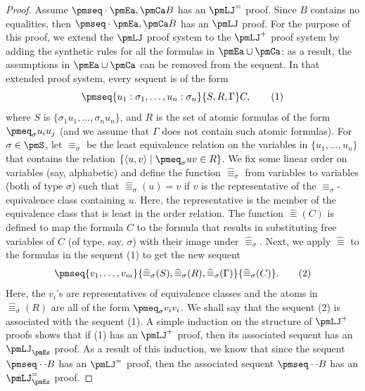 \begin{proof}
Assume $\pmseq\cdot{\pmEa,\pmCa}B$ has an $\pmLJ^=$ proof. Since $B$ contains no equalities, then $\pmseq\cdot{\pmEa,\pmCa}B$ has an $\pmLJ$ proof. For the purpose of this proof, we extend the $\pmLJ$ proof system to the $\pmLJ^+$ proof system by adding the synthetic rules for all the formulas in $\pmEa\cup\pmCa$: as a result, the assumptions in $\pmEa\cup\pmCa$ can be removed from the sequent. In that extended proof system, every sequent is of the form
\begin{equation}\pmseq{u_1:\sigma_1,\ldots,u_n:\sigma_n}{S,R,\Gamma}C,\tag{1}\end{equation}
where $S$ is $\{\sigma_1u_1,\ldots,\sigma_nu_n\}$, and $R$ is the set of atomic formulas of the form $\pmeq_\sigma u_i u_j$ (and we assume that $\Gamma$ does not contain such atomic formulas). For $\sigma\in\pmS$, let $\equiv_\sigma$ be the least equivalence relation on the variables in $\{u_1,\ldots,u_n\}$ that contains the relation $\{\langle u,v\rangle\mid\pmeq_\sigma u v\in R\}$. We fix some linear order on variables (say, alphabetic) and define the function $\widehat{\equiv}_\sigma$ from variables to variables (both of type $\sigma$) such that $\widehat{\equiv}_\sigma(u)=v$ if $v$ is the representative of the $\equiv_\sigma$-equivalence class containing $u$. Here, the representative is the member of the equivalence class that is least in the order relation. The function $\widehat{\equiv}(C)$ is defined to map the formula $C$ to the formula that results in substituting free variables of $C$ (of type, say, $\sigma$) with their image under $\widehat{\equiv}_\sigma$. Next, we apply $\widehat{\equiv}$ to the formulas in the sequent (1) to get the new sequent
\begin{equation}\pmseq{v_1,\ldots,v_m}{\widehat{\equiv}_\sigma(S),\widehat{\equiv}_\sigma(R),\widehat{\equiv}_\sigma(\Gamma)}{\widehat{\equiv}_\sigma(C)}.\tag{2}\end{equation}
Here, the $v_i$'s are representatives of equivalence classes and the atoms in $\widehat{\equiv}_\sigma(R)$ are all of the form $\pmeq_\sigma v_i v_i$. We shall say that the sequent (2) is associated with the sequent (1).
A simple induction on the structure of $\pmLJ^+$ proofs shows that if (1) has an $\pmLJ^+$ proof, then its associated sequent has an $\pmLJ_{\pmEs}$ proof. As a result of this induction, we know that since the sequent $\pmseq\cdot\cdot B$ has an $\pmLJ^=$ proof, then the associated sequent $\pmseq\cdot\cdot B$ has an $\pmLJ^=_{\pmEs}$ proof.
\end{proof}
